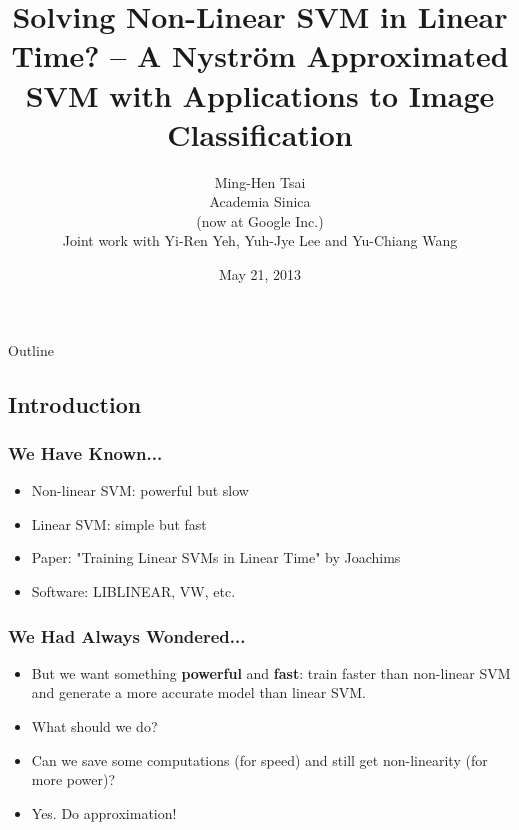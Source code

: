 \documentclass{beamer}
\def\liblinear{{{\sf LIBLINEAR}\xspace}}
\def\vw{{\sf VW}\xspace}
\begin{document}
\section{ }
\title[Nystr\"om Decomposition]{Solving Non-Linear SVM in Linear Time? -- A Nystr\"om Approximated SVM with Applications to Image Classification}
\author[Ming-Hen Tsai]{
Ming-Hen Tsai\\
Academia Sinica\\ 
(now at Google Inc.)\\
\smallskip
\smallskip
Joint work with Yi-Ren Yeh, Yuh-Jye Lee and Yu-Chiang Wang \\
}
\date{May 21, 2013}




\begin{frame}
\titlepage
\end{frame}

\begin{frame}{Outline}
\tableofcontents[pausesections]
\end{frame}

\subsection{Introduction}

\begin{frame}
  \frametitle{We Have Known...}
  \begin{itemize}
    \item Non-linear SVM: powerful but slow 
    \item Linear SVM: simple but fast  
    \item [] Paper: "Training Linear SVMs in Linear Time" by Joachims
    \item [] Software: \liblinear, \vw, etc.
 \end{itemize}
\end{frame}

\begin{frame}
  \frametitle{We Had Always Wondered...}
  \begin{itemize}
    \item But we want something {\bf powerful} and {\bf fast}: train faster than non-linear SVM and generate a more accurate model than linear SVM.
    \pause
    \item [] What should we do? 
    \pause
    \item Can we save some computations (for speed) and still get non-linearity (for more power)?
    \pause
    \item [] Yes. Do approximation!
  \end{itemize}
\end{frame}
\end{document}
